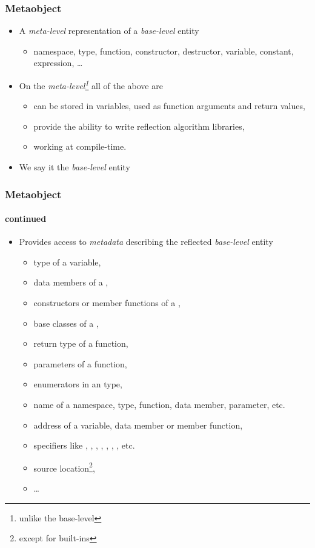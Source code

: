 \documentclass[compress,table,xcolor=table]{beamer}
\begin{document}
\begin{frame}
  \frametitle{Metaobject}
  \larger
  \begin{itemize}
    \item A {\em meta-level} representation of a {\em base-level} entity
      \begin{itemize}
      \smaller
        \item namespace, type, function, constructor, destructor, variable,
          constant, expression, \ldots
      \end{itemize}
    \item On the {\em meta-level\footnote{unlike the base-level}} all
      of the above are 
      \begin{itemize}
      \smaller
        \item can be stored in variables, used as function arguments and
          return values,
        \item provide the ability to write reflection algorithm libraries,
        \item working at compile-time.
      \end{itemize}
    \item We say it  the {\em base-level} entity
  \end{itemize}
\end{frame}
\begin{frame}
  \frametitle{Metaobject}
  \framesubtitle{continued}
  \larger
  \begin{itemize}
    \item Provides access to {\em metadata} describing the reflected
      {\em base-level} entity
      \begin{itemize}
      \smaller
        \item type of a variable,
        \item data members of a ,
        \item constructors or member functions of a ,
        \item base classes of a ,
        \item return type of a function,
        \item parameters of a function,
        \item enumerators in an  type,
        \item name of a namespace, type, function, data member, parameter, etc.
        \item address of a variable, data member or member function,
        \item specifiers like , ,
          , , ,
          , , etc.
        \item source location\footnote{except for built-ins},
        \item \ldots
      \end{itemize}
  \end{itemize}
\end{frame}
\end{document}

